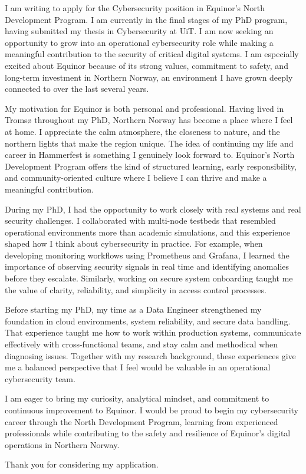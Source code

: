 I am writing to apply for the Cybersecurity position in Equinor’s North Development Program. I am currently in the final stages of my PhD program, having submitted my thesis in Cybersecurity at UiT. I am now seeking an opportunity to grow into an operational cybersecurity role while making a meaningful contribution to the security of critical digital systems. I am especially excited about Equinor because of its strong values, commitment to safety, and long-term investment in Northern Norway, an environment I have grown deeply connected to over the last several years.

My motivation for Equinor is both personal and professional. Having lived in Tromsø throughout my PhD, Northern Norway has become a place where I feel at home. I appreciate the calm atmosphere, the closeness to nature, and the northern lights that make the region unique. The idea of continuing my life and career in Hammerfest is something I genuinely look forward to. Equinor’s North Development Program offers the kind of structured learning, early responsibility, and community-oriented culture where I believe I can thrive and make a meaningful contribution.

During my PhD, I had the opportunity to work closely with real systems and real security challenges. I collaborated with multi-node testbeds that resembled operational environments more than academic simulations, and this experience shaped how I think about cybersecurity in practice. For example, when developing monitoring workflows using Prometheus and Grafana, I learned the importance of observing security signals in real time and identifying anomalies before they escalate. Similarly, working on secure system onboarding taught me the value of clarity, reliability, and simplicity in access control processes. 

Before starting my PhD, my time as a Data Engineer strengthened my foundation in cloud environments, system reliability, and secure data handling. That experience taught me how to work within production systems, communicate effectively with cross-functional teams, and stay calm and methodical when diagnosing issues. Together with my research background, these experiences give me a balanced perspective that I feel would be valuable in an operational cybersecurity team.

I am eager to bring my curiosity, analytical mindset, and commitment to continuous improvement to Equinor. I would be proud to begin my cybersecurity career through the North Development Program, learning from experienced professionals while contributing to the safety and resilience of Equinor’s digital operations in Northern Norway.

Thank you for considering my application.